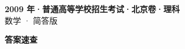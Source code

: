 \documentclass[zihao=-4, a4paper]{ctexart}
\begin{document}
\begin{center}
  {\Large\bfseries 2009 年·普通高等学校招生考试·北京卷·理科}\\[4pt]
  {\large 数学 · 简答版}
\end{center}
\medskip
{}

\clearpage
{}
\begin{center}{\Large\bfseries 答案速查}\end{center}
\medskip

\end{document}
